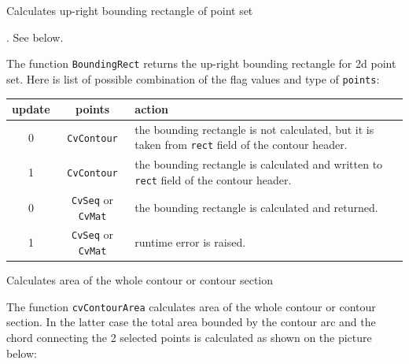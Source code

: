 \label{BoundingRect}

Calculates up-right bounding rectangle of point set


\begin{description}
. See below.
\end{description}

The function \texttt{BoundingRect} returns the up-right bounding rectangle for 2d point set.
Here is list of possible combination of the flag values and type of \texttt{points}:

\begin{tabular}{|c|c|p{3in}|}
\hline
update & points & action \\ \hline
0 & \texttt{CvContour\*} & the bounding rectangle is not calculated, but it is taken from \texttt{rect} field of the contour header.\\ \hline
1 & \texttt{CvContour\*} & the bounding rectangle is calculated and written to \texttt{rect} field of the contour header.\\ \hline
0 & \texttt{CvSeq\*} or \texttt{CvMat\*} & the bounding rectangle is calculated and returned.\\ \hline
1 & \texttt{CvSeq\*} or \texttt{CvMat\*} & runtime error is raised.\\ \hline
\end{tabular}

\label{ContourArea}

Calculates area of the whole contour or contour section


\begin{description}
\end{description}

The function \texttt{cvContourArea} calculates area of the whole contour
or contour section. In the latter case the total area bounded by the
contour arc and the chord connecting the 2 selected points is calculated
as shown on the picture below:

